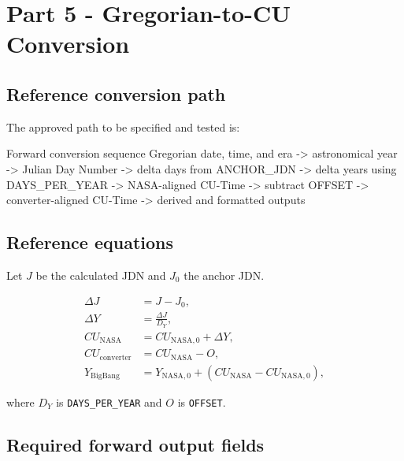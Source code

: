 \documentclass[11pt,letterpaper]{article}
\begin{document}
\section{Part 5 - Gregorian-to-CU Conversion}

\subsection{Reference conversion path}

The approved path to be specified and tested is:

\begin{codebox}{Forward conversion sequence}
Gregorian date, time, and era
  -> astronomical year
  -> Julian Day Number
  -> delta days from ANCHOR_JDN
  -> delta years using DAYS_PER_YEAR
  -> NASA-aligned CU-Time
  -> subtract OFFSET
  -> converter-aligned CU-Time
  -> derived and formatted outputs
\end{codebox}

\subsection{Reference equations}

Let $J$ be the calculated JDN and $J_0$ the anchor JDN.

\begin{align*}
\Delta J &= J - J_0, \\
\Delta Y &= \frac{\Delta J}{D_Y}, \\
CU_{\mathrm{NASA}} &= CU_{\mathrm{NASA},0} + \Delta Y, \\
CU_{\mathrm{converter}} &= CU_{\mathrm{NASA}} - O, \\
Y_{\mathrm{BigBang}} &= Y_{\mathrm{NASA},0}
  + \left(CU_{\mathrm{NASA}} - CU_{\mathrm{NASA},0}\right),
\end{align*}

where $D_Y$ is \texttt{DAYS\_PER\_YEAR} and $O$ is \texttt{OFFSET}.

\subsection{Required forward output fields}
\end{document}
